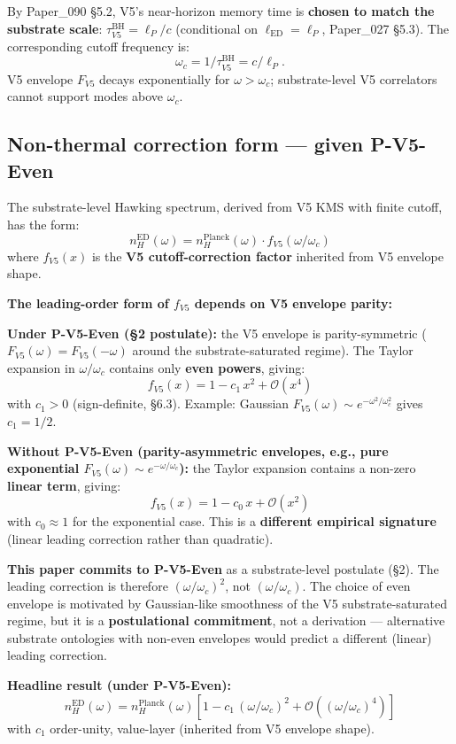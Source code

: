 \documentclass[11pt,a4paper]{article}
\begin{document}
By Paper\_090 \S5.2, V5's near-horizon memory time is \textbf{chosen to match the substrate scale}: $\tau_{V5}^\mathrm{BH} = \ell_P/c$ (conditional on $\ell_\mathrm{ED} = \ell_P$, Paper\_027 \S5.3). The corresponding cutoff frequency is:
\[
\omega_c = 1/\tau_{V5}^\mathrm{BH} = c/\ell_P.
\]
V5 envelope $F_{V5}$ decays exponentially for $\omega > \omega_c$; substrate-level V5 correlators cannot support modes above $\omega_c$.

\subsection{Non-thermal correction form --- given P-V5-Even}

The substrate-level Hawking spectrum, derived from V5 KMS with finite cutoff, has the form:
\[
n_H^\mathrm{ED}(\omega) = n_H^\mathrm{Planck}(\omega) \cdot f_{V5}(\omega/\omega_c)
\]
where $f_{V5}(x)$ is the \textbf{V5 cutoff-correction factor} inherited from V5 envelope shape.

\textbf{The leading-order form of $f_{V5}$ depends on V5 envelope parity:}

\textbf{Under P-V5-Even (\S2 postulate):} the V5 envelope is parity-symmetric ($F_{V5}(\omega) = F_{V5}(-\omega)$ around the substrate-saturated regime). The Taylor expansion in $\omega/\omega_c$ contains only \textbf{even powers}, giving:
\[
f_{V5}(x) = 1 - c_1\,x^2 + \mathcal{O}(x^4)
\]
with $c_1 > 0$ (sign-definite, \S6.3). Example: Gaussian $F_{V5}(\omega) \sim e^{-\omega^2/\omega_c^2}$ gives $c_1 = 1/2$.

\textbf{Without P-V5-Even (parity-asymmetric envelopes, e.g., pure exponential $F_{V5}(\omega) \sim e^{-\omega/\omega_c}$):} the Taylor expansion contains a non-zero \textbf{linear term}, giving:
\[
f_{V5}(x) = 1 - c_0\,x + \mathcal{O}(x^2)
\]
with $c_0 \approx 1$ for the exponential case. This is a \textbf{different empirical signature} (linear leading correction rather than quadratic).

\textbf{This paper commits to P-V5-Even} as a substrate-level postulate (\S2). The leading correction is therefore $(\omega/\omega_c)^2$, not $(\omega/\omega_c)$. The choice of even envelope is motivated by Gaussian-like smoothness of the V5 substrate-saturated regime, but it is a \textbf{postulational commitment}, not a derivation --- alternative substrate ontologies with non-even envelopes would predict a different (linear) leading correction.

\textbf{Headline result (under P-V5-Even):}
\[
\boxed{n_H^\mathrm{ED}(\omega) = n_H^\mathrm{Planck}(\omega)\left[1 - c_1\,(\omega/\omega_c)^2 + \mathcal{O}((\omega/\omega_c)^4)\right]}
\]
with $c_1$ order-unity, value-layer (inherited from V5 envelope shape).
\end{document}
